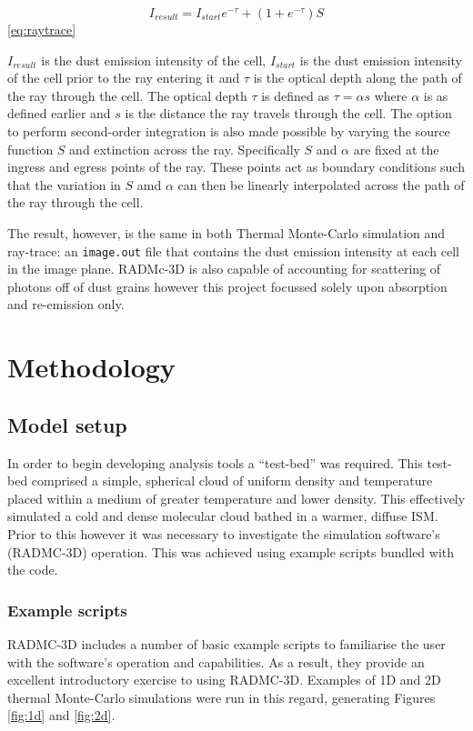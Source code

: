 \documentclass{report}
\begin{document}
\begin{equation}
  I_{result} = I_{start}e^{-\tau}+(1+e^{-\tau})S
\end{equation}\ref{eq:raytrace}

$I_{result}$ is the dust emission intensity of the cell, $I_{start}$ is the dust emission intensity of the cell prior to the ray entering it and $\tau$ is the optical depth along the path of the ray through the cell. The optical depth $\tau$ is defined as $\tau = \alpha s$ where $\alpha$ is as defined earlier and $s$ is the distance the ray travels through the cell. The option to perform second-order integration is also made possible by varying the source function $S$ and extinction across the ray. Specifically $S$ and $\alpha$ are fixed at the ingress and egress points of the ray. These points act as boundary conditions such that the variation in $S$ amd $\alpha$ can then be linearly interpolated across the path of the ray through the cell.

The result, however, is the same in both Thermal Monte-Carlo simulation and ray-trace: an \texttt{image.out} file that contains the dust emission intensity at each cell in the image plane. RADMc-3D is also capable of accounting for scattering of photons off of dust grains however this project focussed solely upon absorption and re-emission only.

\chapter{Methodology}

\section{Model setup}
In order to begin developing analysis tools a ``test-bed'' was required. This test-bed comprised a simple, spherical cloud of uniform density and temperature placed within a medium of greater temperature and lower density. This effectively simulated a cold and dense molecular cloud bathed in a warmer, diffuse ISM. Prior to this however it was necessary to investigate the simulation software's (RADMC-3D) operation. This was achieved using example scripts bundled with the code.

\subsection{Example scripts}
RADMC-3D includes a number of basic example scripts to familiarise the user with the software's operation and capabilities. As a result, they provide an excellent introductory exercise to using RADMC-3D. Examples of 1D and 2D thermal Monte-Carlo simulations were run in this regard, generating Figures \ref{fig:1d} and \ref{fig:2d}.
\end{document}
